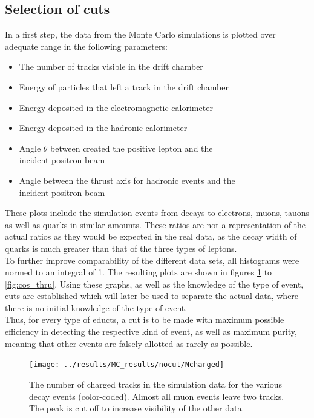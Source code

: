 \subsection{Selection of cuts}
In a first step, the data from the Monte Carlo simulations is plotted over adequate range in the following parameters:
\begin{itemize}
	\item{The number of tracks visible in the drift chamber}
	\item{Energy of particles that left a track in the drift chamber}
	\item{Energy deposited in the electromagnetic calorimeter}
	\item{Energy deposited in the hadronic calorimeter}
	\item{Angle $\theta$ between created the positive lepton and the \\\makebox[3cm][l]{}incident positron beam}
	\item{Angle between the thrust axis for hadronic events and the \\\makebox[3cm][l]{}incident positron beam}
\end{itemize}
These plots include the simulation events from decays to electrons, muons, tauons as well as quarks in similar amounts. These ratios are not a representation of the actual ratios as they would be expected in the real data, as the decay width of quarks is much greater than that of the three types of leptons. \\
To further improve comparability of the different data sets, all histograms were normed to an integral of 1. The resulting plots are shown in figures \ref{fig:Ncharged} to \ref{fig:cos_thru}. Using these graphs, as well as the knowledge of the type of event, cuts are established which will later be used to separate the actual data, where there is no initial knowledge of the type of event.\\
Thus, for every type of educts, a cut is to be made with maximum possible efficiency in detecting the respective kind of event, as well as maximum purity, meaning that other events are falsely allotted as rarely as possible.

\newpage
\begin{figure}[H]
\centering
\texttt{[image: ../results/MC\_results/nocut/Ncharged]}
\caption[Ncharged in simulation data]{The number of charged tracks in the simulation data for the various decay events (color-coded). Almost all muon events leave two tracks. The peak is cut off to increase visibility of the other data.}
\label{fig:Ncharged}
\end{figure}

